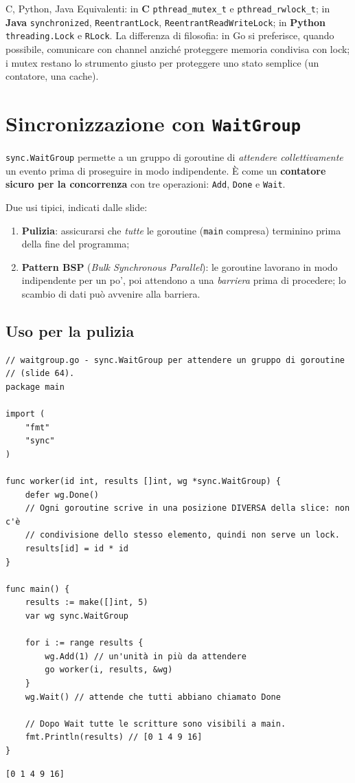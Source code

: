 \documentclass[11pt,a4paper]{report}
\newcommand{\cod}[1]{\texttt{#1}}
\begin{document}
\begin{confronto}{C, Python, Java}
Equivalenti: in \textbf{C} \cod{pthread\_mutex\_t} e
\cod{pthread\_rwlock\_t}; in \textbf{Java} \cod{synchronized}, \cod{ReentrantLock},
\cod{ReentrantReadWriteLock}; in \textbf{Python} \cod{threading.Lock} e
\cod{RLock}. La differenza di filosofia: in Go si preferisce, quando
possibile, comunicare con channel anziché proteggere memoria condivisa con lock;
i mutex restano lo strumento giusto per proteggere uno stato semplice (un
contatore, una cache).
\end{confronto}

\section{Sincronizzazione con \texttt{WaitGroup}}\label{sec:waitgroup}

\cod{sync.WaitGroup} permette a un gruppo di goroutine di \emph{attendere
collettivamente} un evento prima di proseguire in modo indipendente. È come un
\textbf{contatore sicuro per la concorrenza} con tre operazioni: \cod{Add},
\cod{Done} e \cod{Wait}.

Due usi tipici, indicati dalle slide:

\begin{enumerate}
  \item \textbf{Pulizia}: assicurarsi che \emph{tutte} le goroutine (\cod{main}
        compresa) terminino prima della fine del programma;
  \item \textbf{Pattern BSP} (\emph{Bulk Synchronous Parallel}): le goroutine
        lavorano in modo indipendente per un po', poi attendono a una
        \emph{barriera} prima di procedere; lo scambio di dati può avvenire
        alla barriera.
\end{enumerate}

\subsection{Uso per la pulizia}

\begin{lstlisting}[style=gocode,caption={\texttt{06\_concurrency/waitgroup.go}}]
// waitgroup.go - sync.WaitGroup per attendere un gruppo di goroutine
// (slide 64).
package main

import (
	"fmt"
	"sync"
)

func worker(id int, results []int, wg *sync.WaitGroup) {
	defer wg.Done()
	// Ogni goroutine scrive in una posizione DIVERSA della slice: non c'è
	// condivisione dello stesso elemento, quindi non serve un lock.
	results[id] = id * id
}

func main() {
	results := make([]int, 5)
	var wg sync.WaitGroup

	for i := range results {
		wg.Add(1) // un'unità in più da attendere
		go worker(i, results, &wg)
	}
	wg.Wait() // attende che tutti abbiano chiamato Done

	// Dopo Wait tutte le scritture sono visibili a main.
	fmt.Println(results) // [0 1 4 9 16]
}
\end{lstlisting}
\begin{lstlisting}[style=output]
[0 1 4 9 16]
\end{lstlisting}
\end{document}
